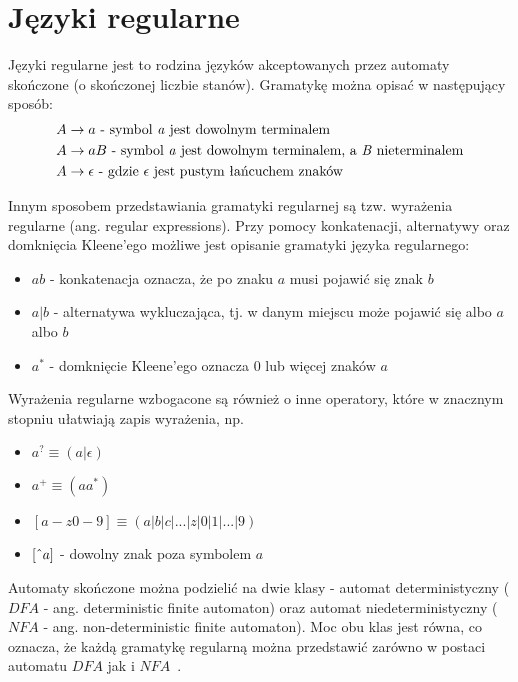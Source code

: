 \section{Języki regularne}
Języki regularne jest to rodzina języków akceptowanych przez automaty skończone (o skończonej liczbie stanów).
Gramatykę można opisać w następujący sposób:
\begin{equation}
    \begin{aligned}
        A &\rightarrow a \text{ - symbol \textit{a} jest dowolnym terminalem} \\
        A &\rightarrow aB \text{ - symbol \textit{a} jest dowolnym terminalem, a \textit{B} nieterminalem} \\
        A &\rightarrow \epsilon \text{ - gdzie $\epsilon$ jest pustym łańcuchem znaków}
    \end{aligned}
\end{equation}
\par
Innym sposobem przedstawiania gramatyki regularnej są tzw. wyrażenia regularne (ang. regular expressions).
Przy pomocy konkatenacji, alternatywy oraz domknięcia Kleene'ego możliwe jest opisanie gramatyki języka regularnego:
\begin{itemize}
    \item $ab$ - konkatenacja oznacza, że po znaku $a$ musi pojawić się znak $b$
    \item $a|b$ - alternatywa wykluczająca, tj. w danym miejscu może pojawić się albo $a$ albo $b$
    \item $a^*$ - domknięcie Kleene'ego oznacza 0 lub więcej znaków $a$
\end{itemize}
Wyrażenia regularne wzbogacone są również o inne operatory, które w znacznym stopniu ułatwiają zapis wyrażenia, np.
\begin{itemize}
    \item $a^? \equiv (a|\epsilon)$
    \item $a^+ \equiv (aa^*)$
    \item $[a-z0-9] \equiv (a|b|c|...|z|0|1|...|9)$
    \item $[\string^a]$ - dowolny znak poza symbolem $a$
\end{itemize}
\par
Automaty skończone można podzielić na dwie klasy - automat deterministyczny ($DFA$ - ang. deterministic finite automaton)
oraz automat niedeterministyczny ($NFA$ - ang. non-deterministic finite automaton). Moc obu klas jest równa, co oznacza,
że każdą gramatykę regularną można przedstawić zarówno w postaci automatu $DFA$ jak i $NFA$~\cite{FormalLanguages1}.
